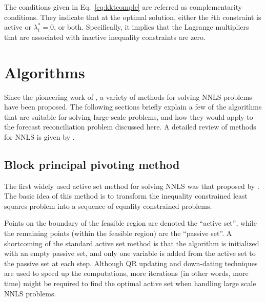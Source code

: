 \documentclass[11pt]{article}
\newcommand{\0}{\phantom{0}}
\begin{document}
The conditions given in Eq.~\eqref{eq:kktcomple} are referred as complementarity conditions. They indicate that at the optimal solution, either the $i$th constraint is active or $\lambda_{i}^{*} = 0$, or both. Specifically, it implies that the Lagrange multipliers that are associated with inactive inequality constraints are zero.

\section{Algorithms}\label{sec:quadalgo}

Since the pioneering work of \citet{Lawson1974}, a variety of methods for solving NNLS problems have been proposed. The following sections briefly explain a few of the algorithms that are suitable for solving large-scale problems, and how they would apply to the forecast reconciliation problem discussed here. A detailed review of methods for NNLS is given by \citet{Chen2009}.

\subsection{Block principal pivoting method}

The first widely used active set method for solving NNLS was that proposed by \citet{Lawson1974}. The basic idea of this method is to transform the inequality constrained least squares problem into a sequence of equality constrained problems.

Points on the boundary of the feasible region are denoted the ``active set'', while the remaining points (within the feasible region) are the ``passive set''. A shortcoming of the standard active set method is that the algorithm is initialized with an empty passive set, and only one variable is added from the active set to the passive set at each step. Although QR updating and down-dating techniques are used to speed up the computations, more iterations (in other words, more time) might be required to find the optimal active set when handling large scale NNLS problems.

\end{document}
